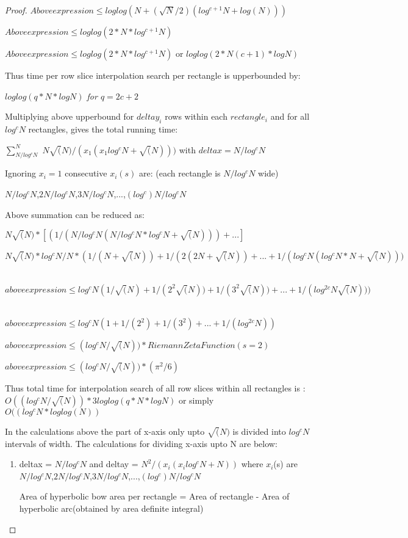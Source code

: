 \documentclass[11pt,onecolumn]{article}
\begin{document}
\begin{proof}
$Above expression \le loglog(N + (\sqrt{N}/2)(log^{c+1}N+log(N)))$

$Above expression \le loglog(2*N*log^{c+1}N)$

$Above expression \le loglog(2*N*log^{c+1}N)$ or $loglog(2*N(c+1)*logN)$

Thus time per row slice interpolation search per rectangle is upperbounded by:

\emph{$loglog(q*N*logN)$ for $q=2c+2$}

Multiplying above upperbound for $deltay_{i}$ rows within each $rectangle_{i}$ and for all $log^{c}N$ rectangles, gives the total running time:

$\sum_{N/log^{c}N}^{N}$ $N\sqrt(N)/(x_{1}(x_{1}log^{c}N+\sqrt(N)))$ with $deltax = N/log^{c}N$

Ignoring $x_{i}=1$ consecutive $x_{i}(s)$ are: (each rectangle is $N/log^{c}N$ wide)

$N/log^{c}N$,$2N/log^{c}N$,$3N/log^{c}N$,...,$(log^{c})N/log^{c}N$

Above summation can be reduced as:

$N\sqrt(N)*[(1/(N/log^{c}N(N/log^{c}N * log^{c}N + \sqrt(N))) + ...]$

$N\sqrt(N)*log^{c}N/N *(1/(N+\sqrt(N))+1/(2(2N+\sqrt(N))+...+1/(log^{c}N(log^{c}N*N+\sqrt(N)))$ \

$aboveexpression \le log^{c}N(1/\sqrt(N)+1/(2^{2}\sqrt(N))+1/(3^{2}\sqrt(N))+...+1/(log^{2c}N\sqrt(N)))$ \

$aboveexpression \le log^{c}N(1+1/(2^{2})+1/(3^{2})+...+1/(log^{2c}N))$ \

$aboveexpression \le (log^{c}N/\sqrt(N))*RiemannZetaFunction(s=2)$ \

$above expression \le (log^{c}N/\sqrt(N)) * (\pi^{2}/6)$

Thus total time for interpolation search of all row  slices within all rectangles is :
$O((log^{c}N/\sqrt(N))*3loglog(q*N*logN)$ or simply $O((log^{c}N*loglog(N))$

In the calculations above the part of x-axis only upto $\sqrt(N)$ is divided into $log^{c}N$ intervals of width. The calculations for dividing x-axis upto N are below:
\begin{enumerate}
\item

deltax = $N/log^{c}N$ and deltay = $N^{2}/(x_{i}(x_{i}log^{c}N + N))$  where $x_{i}$(s) are $N/log^{c}N$,$2N/log^{c}N$,$3N/log^{c}N$,...,$(log^{c})N/log^{c}N$

Area of hyperbolic bow area per rectangle = Area of rectangle - Area of hyperbolic arc(obtained by area definite integral) \


\end{enumerate}
\end{proof}
\end{document}

